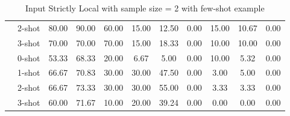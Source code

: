\begin{table*}[t]
{\begin{tabular}{l c ccc ccc ccc}
           & 2-shot & 80.00 & 90.00 & 60.00 & 15.00 & 12.50 & 0.00 & 15.00 & 10.67 & 0.00\\
           & 3-shot & 70.00 & 70.00 & 70.00 & 15.00 & 18.33 & 0.00 & 10.00 & 10.00 & 0.00\\
           \hdashline
          \multirow{4}{*}{rules = 3} & 0-shot & 53.33 & 68.33 & 20.00 & 6.67 & 5.00 & 0.00 & 10.00 & 5.32 & 0.00\\
          & 1-shot & 66.67 & 70.83 & 30.00 & 30.00 & 47.50 & 0.00 & 3.00 & 5.00 & 0.00\\
           & 2-shot & 66.67 & 73.33 & 30.00 & 30.00 & 55.00 & 0.00 & 3.33 & 3.33 & 0.00\\
           & 3-shot & 60.00 & 71.67 & 10.00 & 20.00 & 39.24 & 0.00 & 0.00 & 0.00 & 0.00\\
           \bottomrule
    \end{tabular}
    }
    \caption{Input Strictly Local with sample size = 2 with few-shot example}
    \label{tab:few_shot_ISL}
\end{table*}
